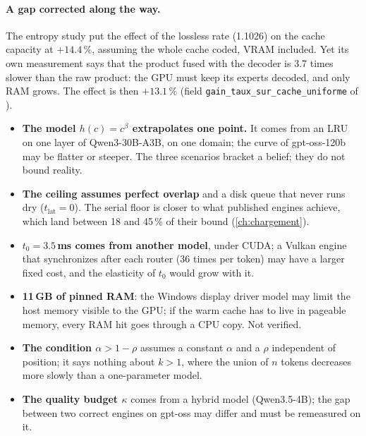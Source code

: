 \paragraph{A gap corrected along the way.} The entropy study put the effect of the lossless rate (1.1026) on the cache capacity at $+14.4\,\%$, assuming the whole cache coded, VRAM included. Yet its own measurement says that the product fused with the decoder is 3.7 times slower than the raw product: the GPU must keep its experts decoded, and only RAM grows. The effect is then $+13.1\,\%$ \calc{} (field \texttt{gain\_taux\_sur\_cache\_uniforme} of ).

\begin{faux}
\begin{itemize}
\item \textbf{The model $h(c) = c^\beta$ extrapolates one point.} It comes from an LRU on one layer of Qwen3-30B-A3B, on one domain; the curve of gpt-oss-120b may be flatter or steeper. The three scenarios bracket a belief; they do not bound reality.
\item \textbf{The ceiling assumes perfect overlap} and a disk queue that never runs dry ($t_{\mathrm{lat}} = 0$). The serial floor is closer to what published engines achieve, which land between 18 and 45\,\% of their bound (\cref{ch:chargement}).
\item \textbf{$t_0 = 3.5$\,ms comes from another model}, under CUDA; a Vulkan engine that synchronizes after each router (36 times per token) may have a larger fixed cost, and the elasticity of $t_0$ would grow with it.
\item \textbf{11\,GB of pinned RAM}: the Windows display driver model may limit the host memory visible to the GPU; if the warm cache has to live in pageable memory, every RAM hit goes through a CPU copy. Not verified.
\item \textbf{The condition $\alpha > 1 - \rho$} assumes a constant $\alpha$ and a $\rho$ independent of position; it says nothing about $k > 1$, where the union of $n$ tokens decreases more slowly than a one-parameter model.
\item \textbf{The quality budget $\kappa$} comes from a hybrid model (Qwen3.5-4B); the gap between two correct engines on gpt-oss may differ and must be remeasured on it.
\end{itemize}
\end{faux}
